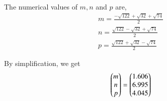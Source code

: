\documentclass[journal,12pt,twocolumn]{IEEEtran}
\theoremstyle{remark}
\begin{document}
\vspace{0.3cm}
The numerical values of $m,n$ and $p$ are,
\begin{align}
m = \frac{-\sqrt{122}+\sqrt{32}+\sqrt{74}}{2}\\
n = \frac{\sqrt{122}-\sqrt{32}+\sqrt{74}}{2}\\
p = \frac{\sqrt{122}+\sqrt{32}-\sqrt{74}}{2}
\end{align}

\vspace{0.3cm}
By simplification, we get
\begin{align}
\begin{pmatrix}m\\n\\p\end{pmatrix} = \begin{pmatrix}1.606\\6.995\\4.045\end{pmatrix}
\end{align}


\newpage


\bigskip

\renewcommand{\thefigure}{\theenumi}
\renewcommand{\thetable}{\theenumi}

%




%
\end{document}
